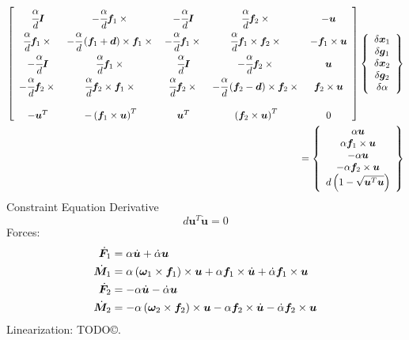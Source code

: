 \documentclass[10pt,dvips,fleqn,subeqn]{report}
\newcommand{\T}[1]{\bm{#1}}
\begin{document}
\begin{align}
	\sqbr{\matr{ccccc}{
		\cfrac{\alpha}{d}\T{I} & -\cfrac{\alpha}{d}\T{f}_1\times{} &
			-\cfrac{\alpha}{d}\T{I} & \cfrac{\alpha}{d}\T{f}_2\times{} & -\T{u} \\
		\cfrac{\alpha}{d}\T{f}_1\times{} & 
			-\cfrac{\alpha}{d}\plbr{\T{f}_1 + \T{d}}\times\T{f}_1\times{} &
			-\cfrac{\alpha}{d}\T{f}_1\times{} & 
			\cfrac{\alpha}{d}\T{f}_1\times\T{f}_2\times{} & 
			-\T{f}_1\times\T{u} \\
		-\cfrac{\alpha}{d}\T{I} & \cfrac{\alpha}{d}\T{f}_1\times{} &
			\cfrac{\alpha}{d}\T{I} & -\cfrac{\alpha}{d}\T{f}_2\times{} & \T{u} \\
		-\cfrac{\alpha}{d}\T{f}_2\times{} &
			\cfrac{\alpha}{d}\T{f}_2\times\T{f}_1\times{} &
			\cfrac{\alpha}{d}\T{f}_2\times{} &
			- \cfrac{\alpha}{d}\plbr{\T{f}_2 - \T{d}}\times{\T{f}_2\times{}} &
			\T{f}_2\times\T{u} \\
		\\
		-\T{u}^T & - \plbr{\T{f}_1\times\T{u}}^T & 
			\T{u}^T & \plbr{\T{f}_2\times\T{u}}^T & 0
	}}\cubr{\cvvect{
		\delta\T{x}_1 \\
		\delta\T{g}_1 \\
		\delta\T{x}_2 \\
		\delta\T{g}_2 \\
		\delta\alpha
	}} & \nonumber \\
	\mbox{} = \cubr{\cvvect{
		\alpha \T{u} \\
		\alpha \T{f}_1\times\T{u} \\
		-\alpha \T{u} \\
		-\alpha \T{f}_2\times\T{u} \\
		d\plbr{1 - \sqrt{\T{u}^T \T{u}}}
	}} &
\end{align}
Constraint Equation Derivative
\begin{equation}
	d \T{u}^T\dot{\T{u}} = 0
\end{equation}
Forces:
\begin{subequations}
\begin{align}
	\dot{\T{F}}_1 &= \alpha \dot{\T{u}} + \dot{\alpha} \T{u} \\
	\dot{\T{M}}_1 &= \alpha \plbr{\T{\omega}_1\times\T{f}_1} \times \T{u} 
		+ \alpha \T{f}_1 \times \dot{\T{u}}
		+ \dot{\alpha} \T{f}_1 \times \T{u} \\
	\dot{\T{F}}_2 &= -\alpha \dot{\T{u}} - \dot{\alpha} \T{u} \\
	\dot{\T{M}}_2 &= -\alpha \plbr{\T{\omega}_2 \times\T{f}_2} \times \T{u}
		- \alpha \T{f}_2 \times \dot{\T{u}}
		- \dot{\alpha} \T{f}_2 \times \T{u}
\end{align}
\end{subequations}
Linearization: TODO\copyright.
\end{document}

